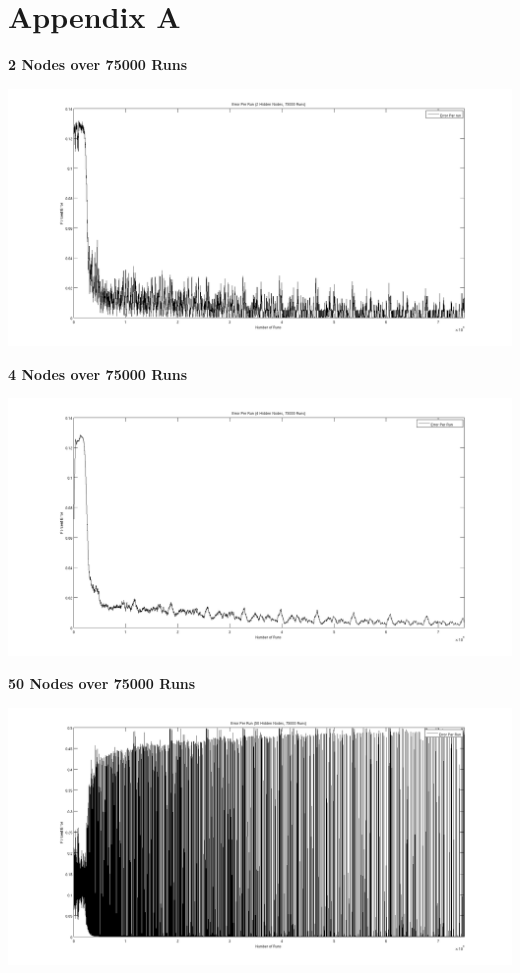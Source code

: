 \documentclass[12pt]{article}%
\begin{document}
\section*{Appendix A}
    \textbf{2 Nodes over 75000 Runs}\\
    \begin{center}
        \includegraphics[scale=.3]{2node75000}\\
    \end{center}
    \textbf{4 Nodes over 75000 Runs}\\
    \begin{center}
        \includegraphics[scale=.3]{4node75000}\\
    \end{center}
    \newpage
    \textbf{50 Nodes over 75000 Runs}\\
    \begin{center}
        \includegraphics[scale=.3]{50node75000}\\
    \end{center}

    
\end{document}
